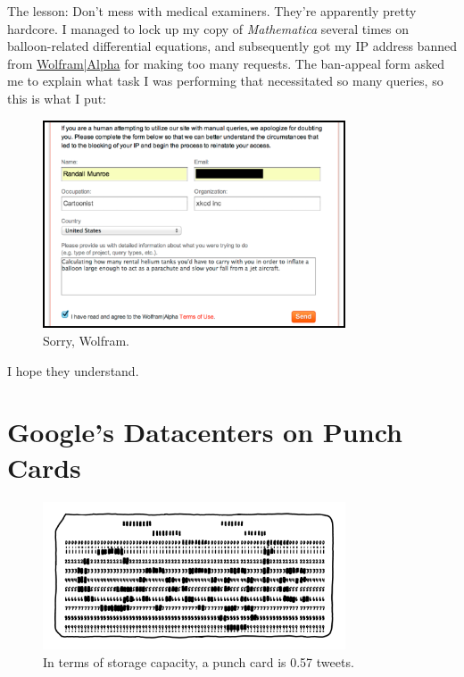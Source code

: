 {{{{The lesson: Don't mess with medical examiners. They're apparently pretty hardcore.} } I managed to lock up my copy of \emph{Mathematica} several times on balloon-related differential equations, and subsequently got my IP address banned from \href{http://www.wolframalpha.com/input/?i=how+many+days+have+i+been+alive}{Wolfram|Alpha} for making too many requests. The ban-appeal form asked me to explain what task I was performing that necessitated so many queries, so this is what I put:}

\begin{figure}[!htbp]
\centering
\includegraphics[scale=0.5, max width=0.8\textwidth]{imgs/a/62/balloon_wolfram.png}
\caption{Sorry, Wolfram.}
\end{figure}

{I hope they understand.}

{
\chapter{Google's Datacenters on Punch Cards}
}

\hfill{}

\begin{figure}[!htbp]
\centering
\includegraphics[scale=0.5, max width=0.8\textwidth]{imgs/a/63/google_punchcard.png}
\caption{In terms of storage capacity, a punch card is 0.57 tweets.}
\end{figure}

}
